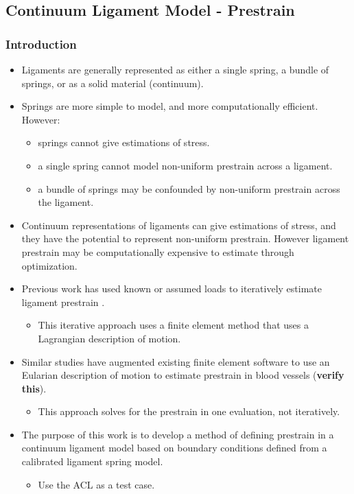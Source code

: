 \documentclass{article}
\begin{document}
\subsection{Continuum Ligament Model - Prestrain}
\subsubsection{Introduction}
\begin{itemize}
    \item Ligaments are generally represented as either a single spring, a bundle of springs, or as a solid material (continuum).
    \item Springs are more simple to model, and more computationally efficient. However:
    \begin{itemize}
        \item springs cannot give estimations of stress.
        \item a single spring cannot model non-uniform prestrain across a ligament.
        \item a bundle of springs may be confounded by non-uniform prestrain across the ligament.
    \end{itemize} 
    \item Continuum representations of ligaments can give estimations of stress, and they have the potential to represent non-uniform prestrain. However ligament prestrain may be computationally expensive to estimate through optimization.
    \item Previous work has used known or assumed loads to iteratively estimate ligament prestrain \citep{maas_general_2016}.
    \begin{itemize}
        \item This iterative approach uses a finite element method that uses a Lagrangian description of motion.
    \end{itemize}
    \item Similar studies have augmented existing finite element software to use an Eularian description of motion \citep{lu_computational_2007} to estimate prestrain in blood vessels (\textbf{verify this}).
    \begin{itemize}
        \item This approach solves for the prestrain in one evaluation, not iteratively.
    \end{itemize}
    \item The purpose of this work is to develop a method of defining prestrain in a continuum ligament model based on boundary conditions defined from a calibrated ligament spring model.
    \begin{itemize}
        \item Use the ACL as a test case.
    \end{itemize}
\end{itemize}
\end{document}
